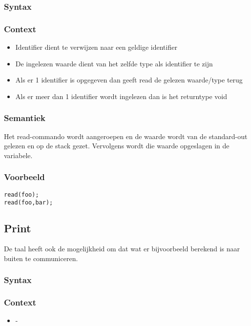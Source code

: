 \documentclass[]{article}
\begin{document}
\subsubsection{Syntax}

\subsubsection{Context}
\begin{itemize}
\item Identifier dient te verwijzen naar een geldige identifier
\item De ingelezen waarde dient van het zelfde type als identifier te zijn
\item Als er 1 identifier is opgegeven dan geeft read de gelezen waarde/type terug
\item Als er meer dan 1 identifier wordt ingelezen dan is het returntype void
\end{itemize}
\subsubsection{Semantiek}
Het read-commando wordt aangeroepen en de waarde wordt van de standard-out gelezen en op de stack gezet. Vervolgens wordt die waarde opgeslagen in de variabele.
\subsubsection{Voorbeeld}
\begin{lstlisting}[style=SELMA]
read(foo);
read(foo,bar);
\end{lstlisting}

\subsection{Print}
De taal heeft ook de mogelijkheid om dat wat er bijvoorbeeld berekend is naar buiten te communiceren.
\subsubsection{Syntax}

\subsubsection{Context}
\begin{itemize}
\item -
\end{itemize}
\end{document}
